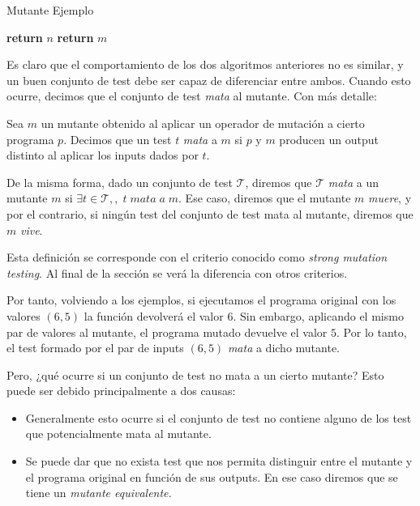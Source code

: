 \begin{algorithm}
\caption{Mutante Ejemplo}
\begin{algorithmic}[1]
    \State  \textbf{return} $n$
\Else
    \State \textbf{return} $m$
\EndIf
\EndProcedure
\end{algorithmic}
\end{algorithm}

Es claro que el comportamiento de los dos algoritmos anteriores no es similar, y un buen conjunto de test debe ser capaz de diferenciar entre ambos. Cuando esto ocurre, decimos que el conjunto de test \textit{mata} al mutante. Con más detalle:

\begin{definition}
Sea $m$ un mutante obtenido al aplicar un operador de mutación a cierto programa $p$.
Decimos que un test $t$ \emph{mata} a $m$ si $p$ y $m$ producen un output distinto al aplicar los inputs dados por $t$.
\end{definition}

De la misma forma, dado un conjunto de test $\mathcal{T}$, diremos que $\mathcal{T}$ \textit{mata} a un mutante $m$ si $\exists t\in \mathcal{T},,\; t \; mata \;a\; m$. Ese caso, diremos que el mutante $m$ \emph{muere}, y por el contrario, si ningún test del conjunto de test mata al mutante, diremos que $m$ \emph{vive}.

Esta definición se corresponde con el criterio conocido como \textit{strong mutation testing}. Al final de la sección se verá la diferencia con otros criterios.

Por tanto, volviendo a los ejemplos, si ejecutamos el programa original con los valores $(6,5)$ la función devolverá el valor $6$. Sin embargo, aplicando el mismo par de valores al mutante, el programa mutado devuelve el valor $5$. Por lo tanto, el test formado por el par de inputs $(6,5)$ \emph{mata} a dicho mutante.

Pero, ¿qué ocurre si un conjunto de test no mata a un cierto mutante? Esto puede ser debido principalmente a dos causas:
\begin{itemize}
\item Generalmente esto ocurre si el conjunto de test no contiene alguno de los test que potencialmente mata al mutante.
\item Se puede dar que no exista test que nos permita distinguir entre el mutante y el programa original en función de sus outputs. En ese caso diremos que se tiene un  \emph{mutante equivalente.}
\end{itemize}

